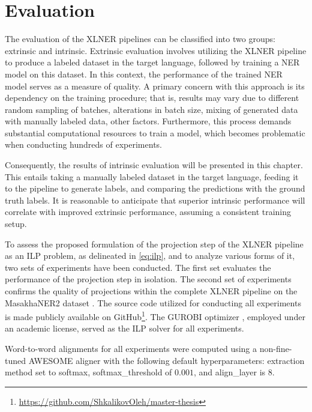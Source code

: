 \chapter{Evaluation}
\label{sec:experiments}

The evaluation of the XLNER pipelines can be classified into two groups: extrinsic and
intrinsic. Extrinsic evaluation involves utilizing the XLNER pipeline to produce a
labeled dataset in the target language, followed by training a NER model on this dataset.
In this context, the performance of the trained NER model serves as a measure of quality.
A primary concern with this approach is its dependency on the training procedure; that is,
results may vary due to different random sampling of batches, alterations in batch size,
mixing of generated data with manually labeled data, other factors. Furthermore,
this process demands substantial computational resources to train a model, which becomes
problematic when conducting hundreds of experiments.

Consequently, the results of intrinsic evaluation will be presented in this chapter.
This entails taking a manually labeled dataset in the target language, feeding it to
the pipeline to generate labels, and comparing the predictions with the ground truth
labels. It is reasonable to anticipate that superior intrinsic performance will
correlate with improved extrinsic performance, assuming a consistent training setup.

To assess the proposed formulation of the projection step of the XLNER pipeline as an
ILP problem, as delineated in \eqref{eq:ilp}, and to analyze various forms of it, two
sets of experiments have been conducted. The first set evaluates the performance of
the projection step in isolation. The second set of experiments confirms the quality
of projections within the complete XLNER pipeline on the MasakhaNER2 dataset
\cite{adelani-etal-2022-masakhaner}. The source code utilized for conducting all
experiments is made publicly available on GitHub\footnote{\url{https://github.com/ShkalikovOleh/master-thesis}}.
The GUROBI optimizer \cite{gurobi}, employed under an academic license, served as the
ILP solver for all experiments.

Word-to-word alignments for all experiments were computed using a non-fine-tuned
AWESOME aligner with the following default hyperparameters: extraction method set
to softmax, softmax\_threshold of \( 0.001 \), and align\_layer is \( 8 \).

